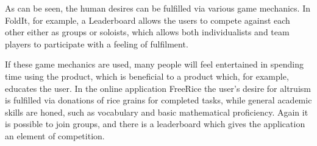 As can be seen, the human desires can be fulfilled via various game mechanics. In FoldIt, for example, a Leaderboard allows the users to compete against each other either as groups or soloists, which allows both individualists and team players to participate with a feeling of fulfilment. 

If these game mechanics are used, many people will feel entertained in spending time using the product, which is beneficial to a product which, for example, educates the user. In the online application FreeRice the user's desire for altruism is fulfilled via donations of rice grains for completed tasks, while general academic skills are honed, such as vocabulary and basic mathematical proficiency. Again it is possible to join groups, and there is a leaderboard which gives the application an element of competition. \cite{freerice}


